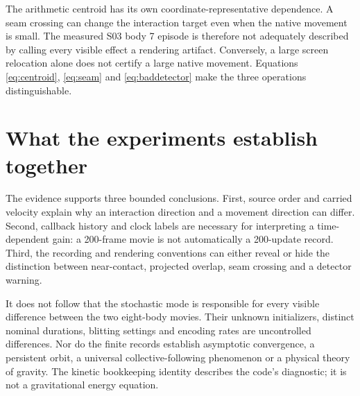 The arithmetic centroid has its own coordinate-representative
dependence. A seam crossing can change the interaction target even
when the native movement is small. The measured S03 body 7 episode
is therefore not adequately described by calling every visible
effect a rendering artifact. Conversely, a large screen relocation
alone does not certify a large native movement. Equations
\eqref{eq:centroid}, \eqref{eq:seam} and \eqref{eq:baddetector}
make the three operations distinguishable. 

\section{What the experiments establish together}
The evidence supports three bounded conclusions. First, source order
and carried velocity explain why an interaction direction and a
movement direction can differ. Second, callback history and clock
labels are necessary for interpreting a time-dependent gain: a
200-frame movie is not automatically a 200-update record. Third,
the recording and rendering conventions can either reveal or hide
the distinction between near-contact, projected overlap, seam
crossing and a detector warning. 

It does not follow that the stochastic mode is responsible for
every visible difference between the two eight-body movies.
Their unknown initializers, distinct nominal durations, blitting
settings and encoding rates are uncontrolled differences.
Nor do the finite records establish asymptotic convergence,
a persistent orbit, a universal collective-following phenomenon
or a physical theory of gravity. The kinetic bookkeeping identity
describes the code's diagnostic; it is not a gravitational energy
equation. 
\FloatBarrier
